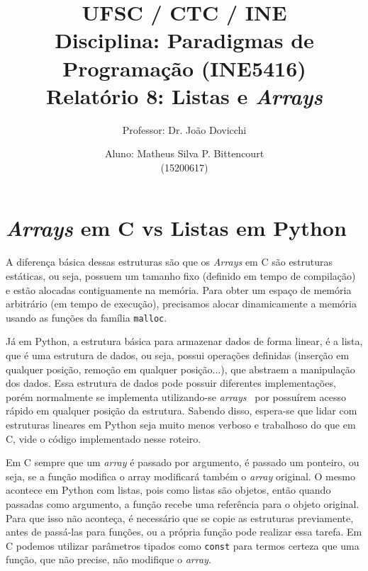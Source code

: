 \documentclass[a4paper,twocolumn,10pt]{article}
\begin{document}
\title{
	\large \rm UFSC / CTC / INE\\
	\large \rm Disciplina: Paradigmas de Programação (INE5416)\\
	\Large \bf Relatório 8: Listas e \textit{Arrays}
}

\author{
	Professor: Dr. João Dovicchi\\
	\and
	Aluno: Matheus Silva P. Bittencourt\\(15200617)
}

\maketitle

\thispagestyle{empty} %

\section{\textit{Arrays} em C vs Listas em Python}

A diferença básica dessas estruturas são que os \textit{Arrays} em C são
estruturas estáticas, ou seja, possuem um tamanho fixo (definido em tempo de
compilação) e estão alocadas contiguamente na memória. Para obter um espaço de
memória arbitrário (em tempo de execução), precisamos alocar dinamicamente a
memória usando as funções da família \texttt{malloc}.

Já em Python, a estrutura básica para armazenar dados de forma linear, é a
lista, que é uma estrutura de dados, ou seja, possui operações definidas
(inserção em qualquer posição, remoção em qualquer posição...), que abstraem a
manipulação dos dados. Essa estrutura de dados pode possuir diferentes
implementações, porém normalmente se implementa utilizando-se
\textit{arrays}~\cite{python-lista} por possuírem acesso rápido em qualquer
posição da estrutura. Sabendo disso, espera-se que lidar com estruturas
lineares em Python seja muito menos verboso e trabalhoso do que em C, vide o
código implementado nesse roteiro.

Em C sempre que um \textit{array} é passado por argumento, é passado um
ponteiro, ou seja, se a função modifica o array modificará também o
\textit{array} original. O mesmo acontece em Python com listas, pois como
listas são objetos, então quando passadas como argumento, a função recebe uma
referência para o objeto original. Para que isso não aconteça, é necessário que
se copie as estruturas previamente, antes de passá-las para funções, ou a
própria função pode realizar essa tarefa. Em C podemos utilizar parâmetros
tipados como \texttt{const} para termos certeza que uma função, que não
precise, não modifique o \textit{array}.

\footnotesize 

\end{document}
